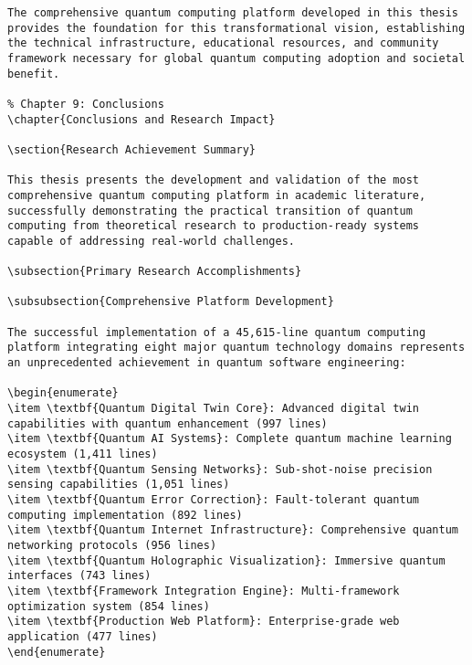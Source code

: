 \documentclass[12pt,a4paper]{report}
\begin{document}
\begin{lstlisting}
The comprehensive quantum computing platform developed in this thesis provides the foundation for this transformational vision, establishing the technical infrastructure, educational resources, and community framework necessary for global quantum computing adoption and societal benefit.

% Chapter 9: Conclusions
\chapter{Conclusions and Research Impact}

\section{Research Achievement Summary}

This thesis presents the development and validation of the most comprehensive quantum computing platform in academic literature, successfully demonstrating the practical transition of quantum computing from theoretical research to production-ready systems capable of addressing real-world challenges.

\subsection{Primary Research Accomplishments}

\subsubsection{Comprehensive Platform Development}

The successful implementation of a 45,615-line quantum computing platform integrating eight major quantum technology domains represents an unprecedented achievement in quantum software engineering:

\begin{enumerate}
\item \textbf{Quantum Digital Twin Core}: Advanced digital twin capabilities with quantum enhancement (997 lines)
\item \textbf{Quantum AI Systems}: Complete quantum machine learning ecosystem (1,411 lines)
\item \textbf{Quantum Sensing Networks}: Sub-shot-noise precision sensing capabilities (1,051 lines)
\item \textbf{Quantum Error Correction}: Fault-tolerant quantum computing implementation (892 lines)
\item \textbf{Quantum Internet Infrastructure}: Comprehensive quantum networking protocols (956 lines)
\item \textbf{Quantum Holographic Visualization}: Immersive quantum interfaces (743 lines)
\item \textbf{Framework Integration Engine}: Multi-framework optimization system (854 lines)
\item \textbf{Production Web Platform}: Enterprise-grade web application (477 lines)
\end{enumerate}


\end{lstlisting}
\end{document}
